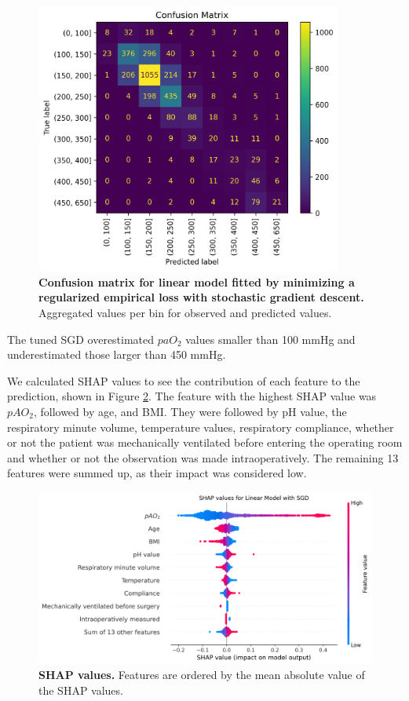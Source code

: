 \documentclass[referee,lineno,pdflatex,sn-nature]{sn-jnl}%
\theoremstyle{thmstyleone}%
\theoremstyle{thmstyletwo}%
\theoremstyle{thmstylethree}%
\begin{document}
\begin{figure}[h]
    \centering
    \includegraphics[width=0.9\textwidth]{images/Figure5.png}
    \caption{\textbf{Confusion matrix for linear model fitted by minimizing a regularized empirical loss with stochastic gradient descent.} Aggregated values per bin for observed and predicted values.}\label{fig5}
\end{figure}

The tuned SGD overestimated $paO_2$ values smaller than 100 mmHg and underestimated those larger than 450 mmHg.

We calculated SHAP values to see the contribution of each feature to the prediction, shown in Figure \ref{fig6}. The feature with the highest SHAP value was $pAO_2$, followed by age, and BMI. They were followed by pH value, the respiratory minute volume, temperature values, respiratory compliance, whether or not the patient was mechanically ventilated before entering the operating room and whether or not the observation was made intraoperatively. The remaining 13 features were summed up, as their impact was considered low.

\begin{figure}[h]
    \centering
    \includegraphics[width=1\linewidth]{images/Figure6.png}
    \caption{\textbf{SHAP values.} Features are ordered by the mean absolute value of the SHAP values.}
    \label{fig6}
\end{figure}
\end{document}
